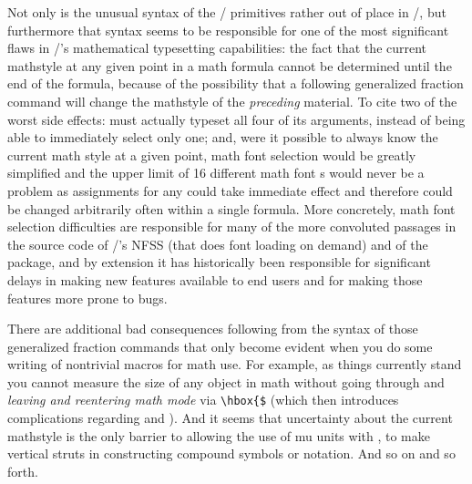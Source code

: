 \documentclass{amsdtx}
\begin{document}
Not only is the unusual syntax of the \tex/ primitives rather out of
place in \latex/, but furthermore that syntax seems to be responsible
for one of the most significant flaws in \tex/'s mathematical
typesetting capabilities: the fact that the current mathstyle at any
given point in a math formula cannot be determined until the end of the
formula, because of the possibility that a following generalized
fraction command will change the mathstyle of the \emph{preceding}
material. To cite two of the worst side effects:  must
actually typeset all four of its arguments, instead of being able to
immediately select only one; and, were it possible to always know the
current math style at a given point, math font selection would be
greatly simplified and the upper limit of 16 different math font
s would never be a problem as 
assignments for any  could take immediate effect and therefore
could be changed arbitrarily often within a single formula. More
concretely, math font selection difficulties are responsible for many of
the more convoluted passages in the source code of \latex/'s NFSS (that
does font loading on demand) and of the  package, and by
extension it has historically been responsible for significant delays in
making new features available to end users and for making those features
more prone to bugs.

There are additional bad consequences following from the syntax of those
generalized fraction commands that only become evident when you do some
writing of nontrivial macros for math use. For example, as things
currently stand you cannot measure the size of any object in math
without going through  and {\em leaving and reentering
math mode\/} via \verb'\hbox{$' (which then introduces complications
regarding  and ). And it seems that
uncertainty about the current mathstyle is the only barrier to allowing
the use of mu units with , to make vertical struts in
constructing compound symbols or notation. And so on and so forth.
\end{document}
